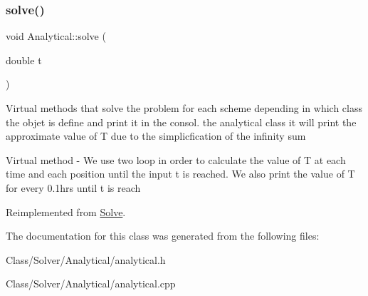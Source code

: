 \subsubsection{\texorpdfstring{solve()}{solve()}}
{\footnotesize\ttfamily void Analytical\+::solve (\begin{DoxyParamCaption}\item[{double}]{t }\end{DoxyParamCaption})\hspace{0.3cm}{\ttfamily [virtual]}}

Virtual methods that solve the problem for each scheme depending in which class the objet is define and print it in the consol.  the analytical class it will print the approximate value of T due to the simplicfication of the infinity sum

Virtual method -\/ We use two loop in order to calculate the value of T at each time and each position until the input t is reached. We also print the value of T for every 0.\+1hrs until t is reach 

Reimplemented from \hyperlink{class_solve_a1a56722993fdabea9928637d7dd8a2c7}{Solve}.



The documentation for this class was generated from the following files\+:\begin{DoxyCompactItemize}
\item 
Class/\+Solver/\+Analytical/analytical.\+h\item 
Class/\+Solver/\+Analytical/analytical.\+cpp\end{DoxyCompactItemize}
